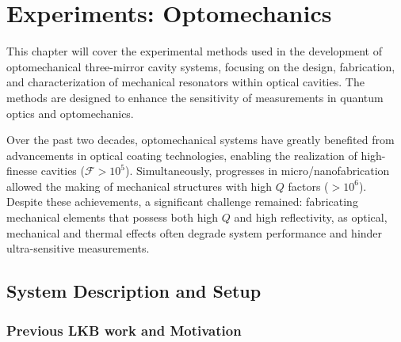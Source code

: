 \chapter{Experiments: Optomechanics}

This chapter will cover the experimental methods used in the development of optomechanical three-mirror cavity systems, focusing on the design, fabrication, and characterization of mechanical resonators within optical cavities. The methods are designed to enhance the sensitivity of measurements in quantum optics and optomechanics.
\minitoc
\newpage 

Over the past two decades, optomechanical systems have greatly benefited from advancements in optical coating technologies, enabling the realization of high-finesse cavities ($\mathcal{F}>10^5$)\cite{coating_review}. Simultaneously, progresses in micro/nanofabrication allowed the making of mechanical structures with high $Q$ factors ($>10^6$)\cite{nanofab_review}. Despite these achievements, a significant challenge remained: fabricating mechanical elements that possess both high $Q$ and high reflectivity, as optical, mechanical and thermal effects often degrade system performance and hinder ultra-sensitive measurements\cite{optomech_challenges}.
\section{System Description and Setup}

\subsection{Previous LKB work and Motivation}

